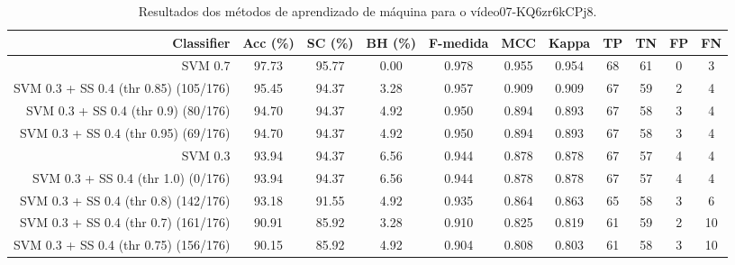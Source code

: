 \begin{table}[!htb]
\centering
\caption{Resultados dos métodos de aprendizado de máquina para o vídeo07-KQ6zr6kCPj8.}
\label{tab:07-KQ6zr6kCPj8}
\begin{tabular}{r|c|c|c|c|c|c|c|c|c|c}
\hline\hline
Classifier & Acc (\%) & SC (\%) & BH (\%) & F-medida & MCC & Kappa & TP & TN & FP & FN \\ \hline
SVM 0.7 & 97.73 & 95.77 & 0.00 & 0.978 & 0.955 & 0.954 & 68 & 61 & 0 & 3 \\ 
SVM 0.3 + SS 0.4 (thr 0.85) (105/176) & 95.45 & 94.37 & 3.28 & 0.957 & 0.909 & 0.909 & 67 & 59 & 2 & 4 \\ 
SVM 0.3 + SS 0.4 (thr 0.9) (80/176) & 94.70 & 94.37 & 4.92 & 0.950 & 0.894 & 0.893 & 67 & 58 & 3 & 4 \\ 
SVM 0.3 + SS 0.4 (thr 0.95) (69/176) & 94.70 & 94.37 & 4.92 & 0.950 & 0.894 & 0.893 & 67 & 58 & 3 & 4 \\ 
SVM 0.3 & 93.94 & 94.37 & 6.56 & 0.944 & 0.878 & 0.878 & 67 & 57 & 4 & 4 \\ 
SVM 0.3 + SS 0.4 (thr 1.0) (0/176) & 93.94 & 94.37 & 6.56 & 0.944 & 0.878 & 0.878 & 67 & 57 & 4 & 4 \\ 
SVM 0.3 + SS 0.4 (thr 0.8) (142/176) & 93.18 & 91.55 & 4.92 & 0.935 & 0.864 & 0.863 & 65 & 58 & 3 & 6 \\ 
SVM 0.3 + SS 0.4 (thr 0.7) (161/176) & 90.91 & 85.92 & 3.28 & 0.910 & 0.825 & 0.819 & 61 & 59 & 2 & 10 \\ 
SVM 0.3 + SS 0.4 (thr 0.75) (156/176) & 90.15 & 85.92 & 4.92 & 0.904 & 0.808 & 0.803 & 61 & 58 & 3 & 10 \\ 
\hline\hline
\end{tabular}
\end{table}
